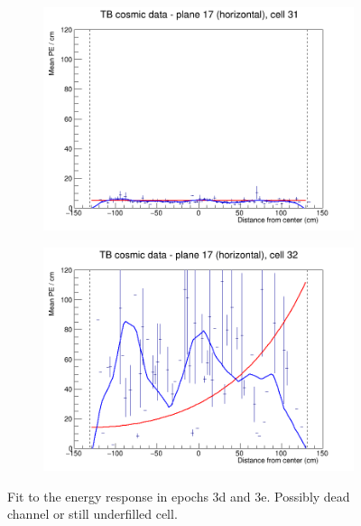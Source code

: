 \documentclass[12pt,a4paper]{article}
\begin{document}
\begin{figure}[h]
  \begin{subfigure}{0.5\textwidth}
    \includegraphics[width=\linewidth]{RelativeCalibrationResults/ep3de_017_031.png}
  \end{subfigure}
  \begin{subfigure}{0.5\textwidth}
    \includegraphics[width=\linewidth]{RelativeCalibrationResults/ep3de_017_032.png}
  \end{subfigure}
  \caption{Fit to the energy response in epochs 3d and 3e. Possibly dead channel or still underfilled cell.}
  \label{figAttenfitResultsEpoch3de_LeftoverUnderfilledCell}
\end{figure}
\end{document}
